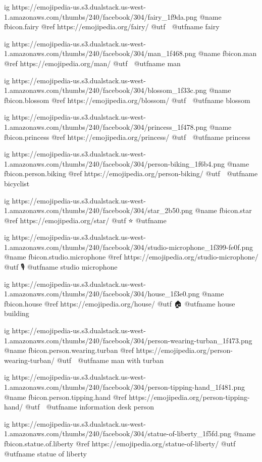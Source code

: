   ig https://emojipedia-us.s3.dualstack.us-west-1.amazonaws.com/thumbs/240/facebook/304/fairy_1f9da.png
  @name fbicon.fairy
  @ref https://emojipedia.org/fairy/
  @utf 🧚
  @utfname fairy

  ig https://emojipedia-us.s3.dualstack.us-west-1.amazonaws.com/thumbs/240/facebook/304/man_1f468.png
  @name fbicon.man
  @ref https://emojipedia.org/man/
  @utf 👨
  @utfname man

  ig https://emojipedia-us.s3.dualstack.us-west-1.amazonaws.com/thumbs/240/facebook/304/blossom_1f33c.png
  @name fbicon.blossom
  @ref https://emojipedia.org/blossom/
  @utf 🌼
  @utfname blossom

  ig https://emojipedia-us.s3.dualstack.us-west-1.amazonaws.com/thumbs/240/facebook/304/princess_1f478.png
  @name fbicon.princess
  @ref https://emojipedia.org/princess/
  @utf 👸
  @utfname princess

  ig https://emojipedia-us.s3.dualstack.us-west-1.amazonaws.com/thumbs/240/facebook/304/person-biking_1f6b4.png
  @name fbicon.person.biking
  @ref https://emojipedia.org/person-biking/
  @utf 🚴
  @utfname bicyclist

  ig https://emojipedia-us.s3.dualstack.us-west-1.amazonaws.com/thumbs/240/facebook/304/star_2b50.png
  @name fbicon.star
  @ref https://emojipedia.org/star/
  @utf ⭐️
  @utfname

  ig https://emojipedia-us.s3.dualstack.us-west-1.amazonaws.com/thumbs/240/facebook/304/studio-microphone_1f399-fe0f.png
  @name fbicon.studio.microphone
  @ref https://emojipedia.org/studio-microphone/
  @utf 🎙
  @utfname studio microphone

  ig https://emojipedia-us.s3.dualstack.us-west-1.amazonaws.com/thumbs/240/facebook/304/house_1f3e0.png
  @name fbicon.house
  @ref https://emojipedia.org/house/
  @utf 🏠
  @utfname house building

  ig https://emojipedia-us.s3.dualstack.us-west-1.amazonaws.com/thumbs/240/facebook/304/person-wearing-turban_1f473.png
  @name fbicon.person.wearing.turban
  @ref https://emojipedia.org/person-wearing-turban/
  @utf 👳
  @utfname man with turban

  ig https://emojipedia-us.s3.dualstack.us-west-1.amazonaws.com/thumbs/240/facebook/304/person-tipping-hand_1f481.png
  @name fbicon.person.tipping.hand
  @ref https://emojipedia.org/person-tipping-hand/
  @utf 💁
  @utfname information desk person

  ig https://emojipedia-us.s3.dualstack.us-west-1.amazonaws.com/thumbs/240/facebook/304/statue-of-liberty_1f5fd.png
  @name fbicon.statue.of.liberty
  @ref https://emojipedia.org/statue-of-liberty/
  @utf 🗽
  @utfname statue of liberty

